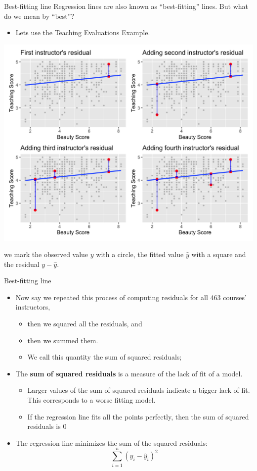 \documentclass[
  ignorenonframetext,
]{beamer}
\providecommand{\tightlist}{%
  \setlength{\itemsep}{0pt}\setlength{\parskip}{0pt}}
\begin{document}
\begin{frame}{Best-fitting line}
\protect\hypertarget{best-fitting-line}{}
Regression lines are also known as ``best-fitting'' lines. But what do
we mean by ``best''?

\begin{itemize}
\tightlist
\item
  Lets use the Teaching Evaluations Example.
\end{itemize}

\begin{center}\includegraphics[width=0.8\linewidth,height=0.5\textheight]{week4_9} \end{center}

we mark the observed value \(y\) with a circle, the fitted value
\(\hat{y}\) with a square and the residual \(y-\hat{y}\).
\end{frame}

\begin{frame}{Best-fitting line}
\protect\hypertarget{best-fitting-line-1}{}
\begin{itemize}
\item
  Now say we repeated this process of computing residuals for all 463
  courses' instructors,

  \begin{itemize}
  \tightlist
  \item
    then we squared all the residuals, and
  \item
    then we summed them.
  \item
    We call this quantity the sum of squared residuals;
  \end{itemize}
\item
  The \textbf{sum of squared residuals} is a measure of the lack of fit
  of a model.

  \begin{itemize}
  \tightlist
  \item
    Larger values of the sum of squared residuals indicate a bigger lack
    of fit. This corresponds to a worse fitting model.
  \item
    If the regression line fits all the points perfectly, then the sum
    of squared residuals is 0
  \end{itemize}
\item
  The regression line minimizes the sum of the squared residuals:
  \[\sum_{i=1}^n(y_i-\hat{y}_i)^2\]
\end{itemize}
\end{frame}
\end{document}
